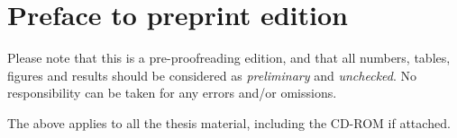 \chapter*{Preface to preprint edition}

Please note that this is a pre-proofreading edition, and that all
numbers, tables, figures and results should be considered as
\emph{preliminary} and \emph{unchecked}. No responsibility can be
taken for any errors and/or omissions.

The above applies to all the thesis material, including the CD-ROM if
attached.